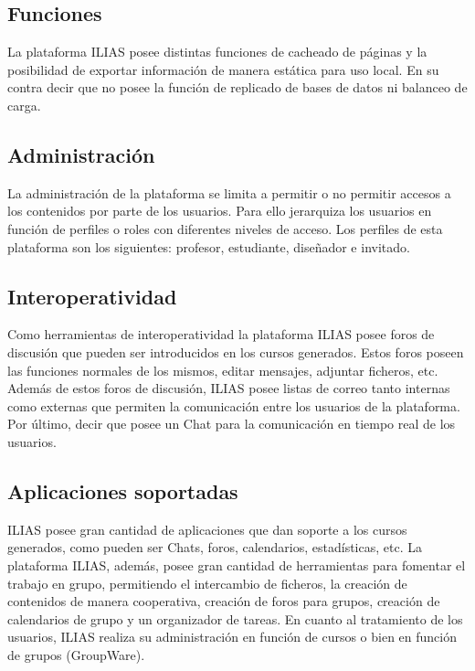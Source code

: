 \subsection{Funciones}

La plataforma ILIAS posee distintas funciones de cacheado de páginas y la posibilidad de exportar información de manera estática para uso local. En su contra decir que no posee la función de replicado de bases de datos ni balanceo de carga.

\subsection{Administración}

La administración de la plataforma se limita a permitir o no permitir accesos a los contenidos por parte de los usuarios. Para ello jerarquiza los usuarios en función de perfiles o roles con diferentes niveles de acceso. Los perfiles de esta plataforma son los siguientes: profesor, estudiante, diseñador e invitado.

\subsection{Interoperatividad}

Como herramientas de interoperatividad la plataforma ILIAS posee foros de discusión que pueden ser introducidos en los cursos generados. Estos foros poseen las funciones normales de los mismos, editar mensajes, adjuntar ficheros, etc. Además de estos foros de discusión, ILIAS posee listas de correo tanto internas como externas que permiten la comunicación entre los usuarios de la plataforma. Por último, decir que posee un Chat para la comunicación en tiempo real de los usuarios.

\subsection{Aplicaciones soportadas}

ILIAS posee gran cantidad de aplicaciones que dan soporte a los cursos generados, como pueden ser Chats, foros, calendarios, estadísticas, etc. La plataforma ILIAS, además, posee gran cantidad de herramientas para fomentar el trabajo en grupo, permitiendo el intercambio de ficheros, la creación de contenidos de manera cooperativa, creación de foros para grupos, creación de calendarios de grupo y un organizador de tareas. En cuanto al tratamiento de los usuarios, ILIAS realiza su administración en función de cursos o bien en función de grupos (GroupWare).


